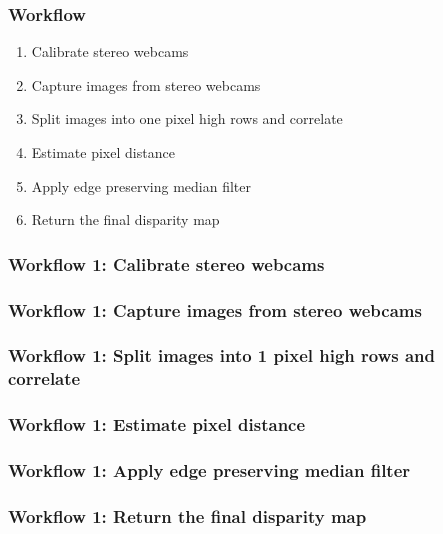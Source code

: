 \documentclass[19pt]{beamer}
\begin{document}
\begin{frame}
\frametitle{Workflow}
\begin{enumerate}
    \item Calibrate stereo webcams
    \item Capture images from stereo webcams
    \item Split images into one pixel high rows and correlate
    \item Estimate pixel distance
    \item Apply edge preserving median filter
    \item Return the final disparity map 
\end{enumerate}
\end{frame}

\begin{frame}
\frametitle{Workflow 1: Calibrate stereo webcams}
\end{frame}

\begin{frame}
\frametitle{Workflow 1: Capture images from stereo webcams}
\end{frame}

\begin{frame}
\frametitle{Workflow 1: Split images into 1 pixel high rows and correlate}
\end{frame}

\begin{frame}
\frametitle{Workflow 1: Estimate pixel distance}
\end{frame}

\begin{frame}
\frametitle{Workflow 1: Apply edge preserving median filter}
\end{frame}

\begin{frame}
\frametitle{Workflow 1: Return the final disparity map}
\end{frame}
\end{document}

